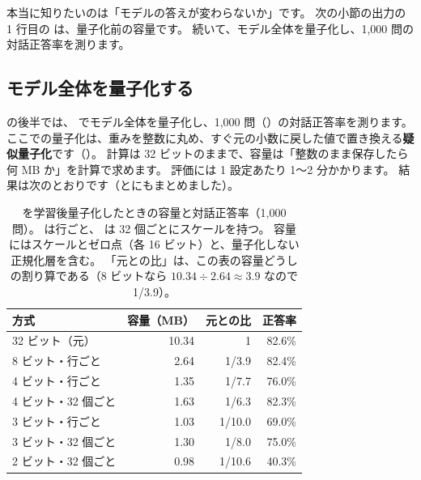 本当に知りたいのは「モデルの答えが変わらないか」です。
次の小節の出力の 1 行目の  は、量子化前の容量です。
続いて、モデル全体を量子化し、1,000 問の対話正答率を測ります。


\subsection{モデル全体を量子化する}\label{sec:distill-quant-model}

 の後半では、 でモデル全体を量子化し、1,000 問（）の対話正答率を測ります。
ここでの量子化は、重みを整数に丸め、すぐ元の小数に戻した値で置き換える\textbf{疑似量子化}です（）。
計算は 32 ビットのままで、容量は「整数のまま保存したら何 MB か」を計算で求めます。
評価には 1 設定あたり 1〜2 分かかります。
結果は次のとおりです（とにもまとめました）。


\begin{table}[tbp]
\centering
\caption{ を学習後量子化したときの容量と対話正答率（1,000 問）。 は行ごと、 は 32 個ごとにスケールを持つ。
容量にはスケールとゼロ点（各 16 ビット）と、量子化しない正規化層を含む。
「元との比」は、この表の容量どうしの割り算である（8 ビットなら $10.34\div2.64\approx3.9$ なので 1/3.9）。}
\label{tab:quant-results}
\begin{tabular}{lrrr}
\toprule
方式 & 容量（MB） & 元との比 & 正答率 \\
\midrule
32 ビット（元） & 10.34 & 1 & 82.6\% \\
8 ビット・行ごと & 2.64 & 1/3.9 & 82.4\% \\
4 ビット・行ごと & 1.35 & 1/7.7 & 76.0\% \\
4 ビット・32 個ごと & 1.63 & 1/6.3 & 82.3\% \\
3 ビット・行ごと & 1.03 & 1/10.0 & 69.0\% \\
3 ビット・32 個ごと & 1.30 & 1/8.0 & 75.0\% \\
2 ビット・32 個ごと & 0.98 & 1/10.6 & 40.3\% \\
\bottomrule
\end{tabular}
\end{table}


